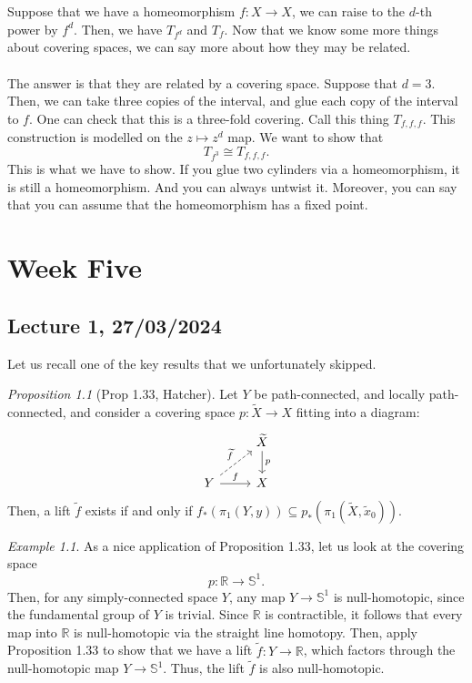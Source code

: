 \documentclass[a4paper]{report}
\theoremstyle{definition}
\theoremstyle{remark}
\theoremstyle{proposition}
\newtheorem{proposition}{Proposition}
\theoremstyle{conjecture}
\theoremstyle{lemma}
\theoremstyle{corollary}
\theoremstyle{exercise}
\newtheorem{example}{Example}
\begin{document}
Suppose that we have a homeomorphism $f : X \to X$, we can raise 
to the $d$-th power by $f^d$. Then, we have $T_{f^d}$ and $T_f$.
Now that we know some more things about covering spaces, we can say more 
about how they may be related.\\\\
The answer is that they are related by a covering space. Suppose that 
$d=3$. Then, we can take three copies of the interval, and glue each 
copy of the interval to $f$. One can check that this is a three-fold covering.
Call this thing $T_{f,f,f}$. 
This construction is modelled on the $z\mapsto z^d$ map. 
We want to show that $$T_{f^3} \cong T_{f,f,f}.$$
This is what we have to show. If you glue two cylinders via a 
homeomorphism, it is still a homeomorphism. And you can always untwist it.
Moreover, you can say that you can assume that the homeomorphism has a 
fixed point.

\chapter{Week Five}

\section{Lecture 1, 27/03/2024}

Let us recall one of the key results that we unfortunately skipped. 

\begin{proposition}[Prop 1.33, Hatcher]
    Let $Y$ be path-connected, and locally path-connected, and consider 
    a covering space $p : \widetilde{X} \to X$ fitting into a diagram:
    $$\begin{tikzcd}
        & \widetilde{X} \arrow[d, "p"] \\
Y \arrow[r, "f"] \arrow[ru, "\widetilde{f}", dashed] & X                           
\end{tikzcd}$$
    Then, a lift $\widetilde{f}$ exists if and only if 
    $f_\ast(\pi_1(Y,y)) \subseteq p_\ast(\pi_1(\widetilde{X},\widetilde{x}_0))$.
\end{proposition}

\begin{example}
    As a nice application of Proposition 1.33, let us look at the covering space 
    $$p  : \mathbb{R} \longrightarrow \mathbb{S}^1.$$ 
    Then, for any simply-connected space $Y$, any map $Y \to \mathbb{S}^1$ is 
    null-homotopic, since 
    the fundamental group of $Y$ is trivial. Since $\mathbb{R}$ is contractible, 
    it follows that every map into $\mathbb{R}$ is null-homotopic via the straight 
    line homotopy. 
    Then, apply Proposition 1.33 to show that we have a lift 
    $\widetilde{f} : Y \to \mathbb{R}$, 
    which factors through the null-homotopic map $Y \to \mathbb{S}^1$. 
    Thus, the lift $\widetilde{f}$ is also null-homotopic.
\end{example}
\end{document}
